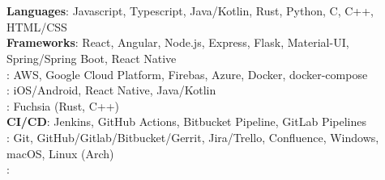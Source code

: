 \documentclass[letterpaper,11pt]{article}
\begin{document}
\section{}
\begin{itemize}[leftmargin=0.15in, label={}]
\small{\item{
\textbf{Languages}{: Javascript, Typescript, Java/Kotlin, Rust, Python, C, C++, HTML/CSS} \\
\textbf{Frameworks}{: React, Angular, Node.js, Express, Flask, Material-UI, Spring/Spring Boot, React Native} \\
\textbf{}{: AWS, Google Cloud Platform, Firebas, Azure, Docker, docker-compose} \\
\textbf{}{: iOS/Android, React Native, Java/Kotlin} \\
\textbf{}{: Fuchsia (Rust, C++)} \\
\textbf{CI/CD}{: Jenkins, GitHub Actions, Bitbucket Pipeline, GitLab Pipelines} \\
\textbf{}{: Git, GitHub/Gitlab/Bitbucket/Gerrit, Jira/Trello, Confluence, Windows, macOS, Linux (Arch)} \\
\textbf{}{: }
}}
\end{itemize}


\end{document}
